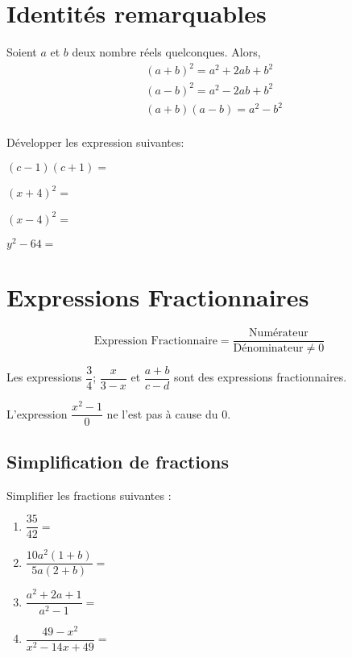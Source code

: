 \documentclass{poly}
\begin{document}
\section{Identités remarquables}
\begin{proposition}
Soient $a$ et $b$ deux nombre réels quelconques. Alors,
\begin{equation*}
\begin{aligned}
&(a + b)^2 = a^2 + 2ab + b^2\\ 
&(a - b)^2 = a^2 - 2ab + b^2\\ 
&(a + b)(a - b) = a^2 - b^2\\ 
\end{aligned}
\end{equation*}
\end{proposition}
\begin{example}
Développer les expression suivantes:
\begin{alphaquestions}
\item $(c-1)(c+1)=$ \answerline
\item $(x+4)^2=$ \answerline
\item $(x-4)^2=$ \answerline
\item $y^2 - 64 =$ \answerline
\end{alphaquestions}    
\end{example}
\newpage
\section{Expressions Fractionnaires}
\begin{definition}
\begin{equation*}
\text{Expression Fractionnaire} = \dfrac{\text{Numérateur}}{\text{Dénominateur} \neq 0}
\end{equation*}
\end{definition}
\begin{example}

Les expressions $\dfrac{3}{4}$; $\dfrac{x}{3-x}$ et $\dfrac{a + b}{c - d}$ sont des expressions fractionnaires.

L'expression $\dfrac{x^2 - 1}{0}$ ne l'est pas à cause du $0$.
\end{example}

\subsection{Simplification de fractions}
\begin{example}
Simplifier les fractions suivantes :
\begin{enumerate}[label=\emph{\alph*})]
\item $\dfrac{35}{42} =$  \answerline
\item $\dfrac{10a^2(1 + b)}{5a(2 + b)} = $ \answerline
\item $\dfrac{a^2 + 2a + 1}{a^2 - 1} =$ \answerline
\item $\dfrac{49 - x^2}{x^2-14x+49} =$ \answerline
\end{enumerate}
\end{example}
\end{document}

